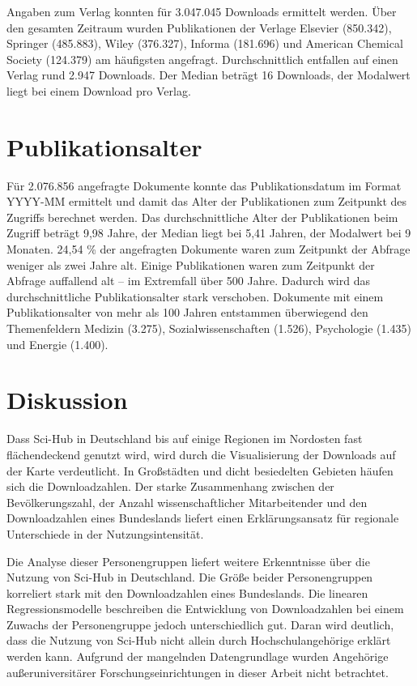 \documentclass[a4paper,
fontsize=11pt,
oneside,
numbers=noperiodatend,
parskip=half-,
bibliography=totoc,
final
]{scrartcl}
\begin{document}
Angaben zum Verlag konnten für 3.047.045 Downloads ermittelt werden.
Über den gesamten Zeitraum wurden Publikationen der Verlage Elsevier
(850.342), Springer (485.883), Wiley (376.327), Informa (181.696) und
American Chemical Society (124.379) am häufigsten angefragt.
Durchschnittlich entfallen auf einen Verlag rund 2.947 Downloads. Der
Median beträgt 16 Downloads, der Modalwert liegt bei einem Download pro
Verlag.

\hypertarget{publikationsalter}{%
\section{Publikationsalter}\label{publikationsalter}}

Für 2.076.856 angefragte Dokumente konnte das Publikationsdatum im
Format YYYY-MM ermittelt und damit das Alter der Publikationen zum
Zeitpunkt des Zugriffs berechnet werden. Das durchschnittliche Alter der
Publikationen beim Zugriff beträgt 9,98 Jahre, der Median liegt bei 5,41
Jahren, der Modalwert bei 9 Monaten. 24,54 \% der angefragten Dokumente
waren zum Zeitpunkt der Abfrage weniger als zwei Jahre alt. Einige
Publikationen waren zum Zeitpunkt der Abfrage auffallend alt -- im
Extremfall über 500 Jahre. Dadurch wird das durchschnittliche
Publikationsalter stark verschoben. Dokumente mit einem
Publikationsalter von mehr als 100 Jahren entstammen überwiegend den
Themenfeldern Medizin (3.275), Sozialwissenschaften (1.526), Psychologie
(1.435) und Energie (1.400).

\hypertarget{diskussion}{%
\section{Diskussion}\label{diskussion}}

Dass Sci-Hub in Deutschland bis auf einige Regionen im Nordosten fast
flächendeckend genutzt wird, wird durch die Visualisierung der Downloads
auf der Karte verdeutlicht. In Großstädten und dicht besiedelten
Gebieten häufen sich die Downloadzahlen. Der starke Zusammenhang
zwischen der Bevölkerungszahl, der Anzahl wissenschaftlicher
Mitarbeitender und den Downloadzahlen eines Bundeslands liefert einen
Erklärungsansatz für regionale Unterschiede in der Nutzungsintensität.

Die Analyse dieser Personengruppen liefert weitere Erkenntnisse über die
Nutzung von Sci-Hub in Deutschland. Die Größe beider Personengruppen
korreliert stark mit den Downloadzahlen eines Bundeslands. Die linearen
Regressionsmodelle beschreiben die Entwicklung von Downloadzahlen bei
einem Zuwachs der Personengruppe jedoch unterschiedlich gut. Daran wird
deutlich, dass die Nutzung von Sci-Hub nicht allein durch
Hochschulangehörige erklärt werden kann. Aufgrund der mangelnden
Datengrundlage wurden Angehörige außeruniversitärer
Forschungseinrichtungen in dieser Arbeit nicht betrachtet.
\end{document}
